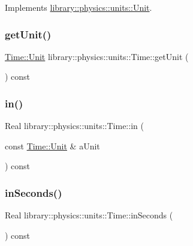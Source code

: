Implements \hyperlink{classlibrary_1_1physics_1_1units_1_1_unit_aff727141d73acddfae382e5e375f4640}{library\+::physics\+::units\+::\+Unit}.

\mbox{\label{classlibrary_1_1physics_1_1units_1_1_time_ad058563b71fd972a66b647d6ca8b7fbe}} 
\subsubsection{\texorpdfstring{get\+Unit()}{getUnit()}}
{\footnotesize\ttfamily \hyperlink{classlibrary_1_1physics_1_1units_1_1_time_ab876a6a05c9a2f28905f2753bfd64109}{Time\+::\+Unit} library\+::physics\+::units\+::\+Time\+::get\+Unit (\begin{DoxyParamCaption}{ }\end{DoxyParamCaption}) const}

\mbox{\label{classlibrary_1_1physics_1_1units_1_1_time_a88217c85038d0153f699166de8746383}} 
\subsubsection{\texorpdfstring{in()}{in()}}
{\footnotesize\ttfamily Real library\+::physics\+::units\+::\+Time\+::in (\begin{DoxyParamCaption}\item[{const \hyperlink{classlibrary_1_1physics_1_1units_1_1_time_ab876a6a05c9a2f28905f2753bfd64109}{Time\+::\+Unit} \&}]{a\+Unit }\end{DoxyParamCaption}) const}

\mbox{\label{classlibrary_1_1physics_1_1units_1_1_time_a8fb17118722828e091a29a665d402a8e}} 
\subsubsection{\texorpdfstring{in\+Seconds()}{inSeconds()}}
{\footnotesize\ttfamily Real library\+::physics\+::units\+::\+Time\+::in\+Seconds (\begin{DoxyParamCaption}{ }\end{DoxyParamCaption}) const}

